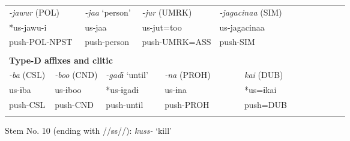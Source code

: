 \begin{tabularx}{\textwidth}{XXm{}XXXXXXXXXXXXXXXXXXXX}
\multicolumn{4}{X}{{ \textit{{}-jawur} (POL)}} & \multicolumn{3}{X}{{ \textit{{}-jaa} ‘person’}} & \multicolumn{5}{X}{{ \textit{{}-jur} (UMRK)}} & \multicolumn{4}{X}{{ \textit{{}-jagacinaa} (SIM)}} & \multicolumn{7}{X}{}\\
\multicolumn{4}{X}{{ *us-jawu-i}} & \multicolumn{3}{X}{us-jaa} & \multicolumn{5}{X}{us-jut=too} & \multicolumn{4}{X}{{ us-jagacinaa}} & \multicolumn{7}{X}{}\\
\multicolumn{4}{X}{push-POL-NPST} & \multicolumn{3}{X}{push-person} & \multicolumn{5}{X}{push-UMRK=ASS} & \multicolumn{4}{X}{push-SIM} & \multicolumn{7}{X}{}\\
\multicolumn{23}{X}{}\\
\multicolumn{23}{X}{{\bfseries Type-D affixes and clitic}}\\
{ \textit{{}-ba} (CSL)} & \multicolumn{4}{X}{{ \textit{{}-boo} (CND)}} & \multicolumn{4}{X}{{ \textit{{}-gadɨ} ‘until’}} & \multicolumn{4}{X}{{ \textit{{}-na} (PROH)}} & \multicolumn{4}{X}{{ \textit{kai} (DUB)}} & \multicolumn{6}{X}{}\\
{ us-ɨba} & \multicolumn{4}{X}{{ us-ɨboo}} & \multicolumn{4}{X}{{ *us-ɨgadɨ}} & \multicolumn{4}{X}{{ us-ɨna}} & \multicolumn{4}{X}{{ *us=ɨkai}} & \multicolumn{6}{X}{}\\
push-CSL & \multicolumn{4}{X}{push-CND} & \multicolumn{4}{X}{push-until} & \multicolumn{4}{X}{push-PROH} & \multicolumn{4}{X}{push=DUB} & \multicolumn{6}{X}{}\\
\lspbottomrule
\end{tabularx}
Stem No. 10 (ending with //ss//): \textit{kuss-} ‘kill’

\tablefirsthead{}

